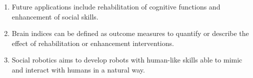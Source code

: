 \begin{enumerate}[label=\arabic*.]
    \item Future applications include rehabilitation of cognitive functions and enhancement of social skills.
    
    \item Brain indices can be defined as outcome measures to quantify or describe the effect of rehabilitation or enhancement interventions.
    
    \item Social robotics aims to develop robots with human-like skills able to mimic and interact with humans in a natural way.
\end{enumerate}
